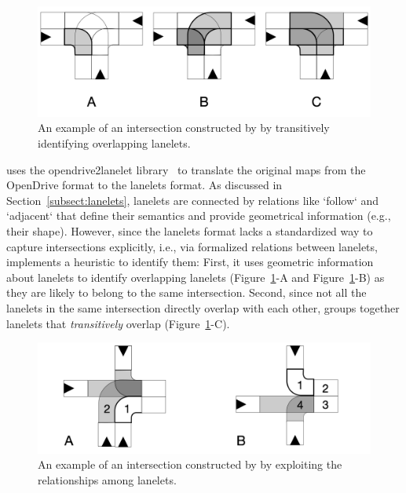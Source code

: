 \documentclass[conference]{IEEEtran}
\begin{document}
\begin{figure}
  \centering
    \includegraphics[width=0.95\columnwidth]{images/overlapping}
  \caption{An example of an intersection constructed by \tool by transitively identifying overlapping lanelets.}
  \label{fig:overlapping}
\end{figure}

\tool uses the opendrive2lanelet library~\cite{althoff2018automatic} to translate the original maps from the OpenDrive format to the lanelets format. As discussed in Section~\ref{subsect:lanelets}, lanelets are connected by relations like `follow` and `adjacent` that define their semantics and provide geometrical information (e.g., their shape). 
However, since the lanelets format lacks a standardized way to capture intersections explicitly, i.e., via formalized relations between lanelets, \tool implements a heuristic to identify them: 
First, it uses geometric information about lanelets to identify overlapping lanelets (\mbox{Figure~\ref{fig:overlapping}-A} and \mbox{Figure~\ref{fig:overlapping}-B}) as they are likely to belong to the same intersection. Second, since not all the lanelets in the same intersection directly overlap with each other, \tool groups together lanelets that \emph{transitively} overlap (\mbox{Figure~\ref{fig:overlapping}-C}).


\begin{figure}
  \centering
    \includegraphics[width=0.95\columnwidth]{images/nonoverlapping}
  \caption{An example of an intersection constructed by \tool by exploiting the relationships among lanelets.}
  \label{fig:nonoverlapping}
\end{figure}
\end{document}
